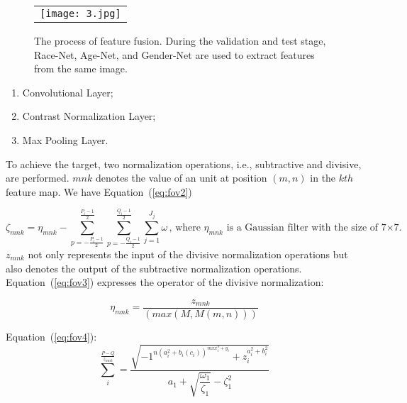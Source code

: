 \documentclass[12pt]{spieman}
\begin{document}
\begin{spacing}{2}
\begin{figure}
\begin{center}
\begin{tabular}{c}
\texttt{[image: 3.jpg]}
\end{tabular}
\end{center}
\caption 
{ \label{fig:example3}
The process of feature fusion. During the validation and test stage, Race-Net, Age-Net, and Gender-Net are used to extract features from the same image. } 
\end{figure} 

\begin{enumerate}
\item Convolutional Layer;
\item Contrast Normalization Layer;
\item Max Pooling Layer.
\end{enumerate}

To achieve the target, two normalization operations, i.e., subtractive and divisive, are performed. $mnk$ denotes the value of an unit at position $(m, n)$ in the $kth$ feature map. We have Equation~(\ref{eq:fov2})

\begin{equation}
\label{eq:fov2}
\zeta_{mnk}= \eta_{mnk}-\sum_{p=-\frac{P_{i}-1}{2}}^{\frac{P_{i}-1}{2}}\sum_{p=-\frac{Q_{i}-1}{2}}^{\frac{Q_{i}-1}{2}}\sum_{j=1}^{J_{j}}\omega\, \text{, where $\eta_{mnk}$ is a Gaussian filter with the size of 7×7.}
\end{equation}
 $z_{mnk}$ not only represents the input of the divisive normalization operations but also denotes the output of the subtractive normalization operations. Equation~(\ref{eq:fov3}) expresses the operator of the divisive normalization: 

\begin{equation}
\label{eq:fov3}
\eta_{mnk}=\frac{z_{mnk}}{\left(max(M,M(m,n))\right)}
\end{equation}

Equation~(\ref{eq:fov4}):
\begin{equation}
\label{eq:fov4}
\sum_{i}^{\frac{P-Q}{z_{mnk}}}=\dfrac{\sqrt{{-1^{n\left(a_{i}^{2}+b_{i}(c_{i})\right)^{mxx_{i}^{3}+y_{i}}}+z_{i}^{a_{i}^{2}+b_{i}^{2}}}}} {a_{1}+\sqrt{\dfrac{\omega_{1}}{\zeta_{1}}} - \zeta_{1}^{2}}
\end{equation}

\end{spacing}
\end{document}
